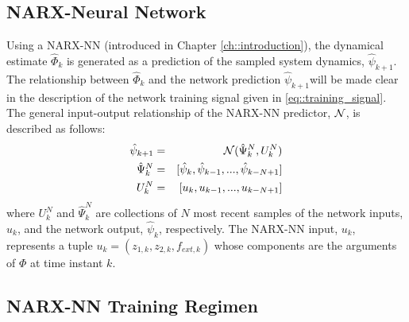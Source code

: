 		\subsection{NARX-Neural Network}


			Using a NARX-NN (introduced in Chapter \ref{ch::introduction}), the dynamical estimate $\hat{\Phi}_{k}$ is generated as a prediction of the sampled system dynamics, $\hat{\psi}_{k+1}$. The relationship between $\hat{\Phi}_{k}$ and the network prediction $\hat{\psi}_{k+1}$will be made clear in the description of the network training signal given in \ref{eq::training_signal}. The general input-output relationship of the NARX-NN predictor, ${\cal N}$, is described as follows:
				\begin{eqnarray}
					\hat{\psi}_{k+1}	&=& {\cal N}(\hat{\Psi}_{k}^{N},{U}_{k}^{N}) \nonumber\\
					\hat{\Psi}_{k}^{N}	&=& [\hat{\psi}_{k},\hat{\psi}_{k-1},...,\hat{\psi}_{k-N+1}]  \nonumber\\
					{U}_{k}^{N}		&=& [u_{k}   ,u_{k-1}   ,...,u_{k-N+1}   ]
					\label{eq::narx_model}
				\end{eqnarray}
			where ${U}_{k}^{N}$  and $\hat{\Psi}_{k}^{N}$ are collections of $N$ most recent samples of the network inputs, $u_{k}$, and the network output, $\hat{\psi}_{k}$, respectively. The NARX-NN input, $u_{k}$, represents a tuple $u_{k} = (z_{1,k}, z_{2,k}, f_{ext,k})$ whose components are the arguments of $\Phi$ at time instant $k$. 



		\subsection{NARX-NN Training Regimen}
			

